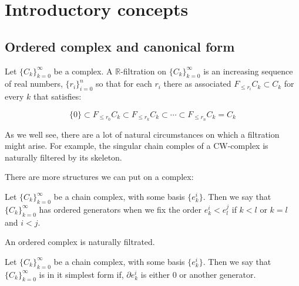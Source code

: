 \chapter{Introductory concepts}

\newcommand{\R}{\mathbb{R}}

\section{Ordered complex and canonical form}


\begin{definition}[$\R$-Filtered complex]
Let $\{C_k\}_{k=0}^{\infty}$ be a complex. 
A $\R$-filtration on $\{C_k\}_{k=0}^{\infty}$ 
is an increasing sequence of real numbers, $\{r_i\}_{i=0}^n$
so that for each $r_i$ there as associated $F_{\leq r_i}C_k\subset C_k$ for every $k$
that satisfies:

$$
\{0\}\subset
F_{\leq r_0}C_k
\subset
F_{\leq r_k}C_k
\subset
\cdots
\subset
F_{\leq r_n}C_k
=
C_k
$$
\end{definition}

As we well see, there are a lot of natural circumstances on which a filtration might arise. For example, 
the singular chain comples of a CW-complex is naturally filtered by its skeleton.

There are more structures we can put on a complex:

\begin{definition}

Let $\{C_k\}_{k=0}^{\infty}$ be a chain complex, with some basis $\{e_k^i\}$.
Then we say that $\{C_k\}_{k=0}^{\infty}$ has ordered generators when we fix the order 
$e_k^i<e_l^j$ if $k<l$ or $k=l$ and $i<j$.

\end{definition}

\begin{remark}
An ordered complex is naturally filtrated.
\end{remark}


\begin{definition}

Let $\{C_k\}_{k=0}^{\infty}$ be a chain complex, with some basis $\{e_k^i\}$.
Then we say that $\{C_k\}_{k=0}^{\infty}$ is in it simplest form if, $\partial e_k^i$
is either $0$ or another generator.
\end{definition}

